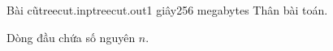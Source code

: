 \begin{problem}{Bài cũ}{treecut.inp}{treecut.out}{1 giây}{256 megabytes}
Thân bài toán.

\InputFile
Dòng đầu chứa số nguyên $n$.
\end{problem}
